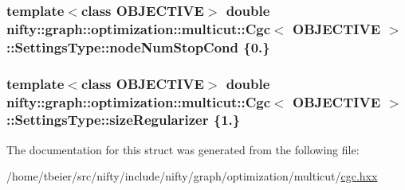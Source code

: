 \subsubsection[{node\+Num\+Stop\+Cond}]{\setlength{\rightskip}{0pt plus 5cm}template$<$class O\+B\+J\+E\+C\+T\+I\+V\+E$>$ double {\bf nifty\+::graph\+::optimization\+::multicut\+::\+Cgc}$<$ O\+B\+J\+E\+C\+T\+I\+V\+E $>$\+::Settings\+Type\+::node\+Num\+Stop\+Cond \{0.\}}\label{structnifty_1_1graph_1_1optimization_1_1multicut_1_1Cgc_1_1SettingsType_ae9427f6ec23229cc5e697504f73a7e4f}
\hypertarget{structnifty_1_1graph_1_1optimization_1_1multicut_1_1Cgc_1_1SettingsType_af336bc11dc1cd15a48db638d53dbc820}{}
\subsubsection[{size\+Regularizer}]{\setlength{\rightskip}{0pt plus 5cm}template$<$class O\+B\+J\+E\+C\+T\+I\+V\+E$>$ double {\bf nifty\+::graph\+::optimization\+::multicut\+::\+Cgc}$<$ O\+B\+J\+E\+C\+T\+I\+V\+E $>$\+::Settings\+Type\+::size\+Regularizer \{1.\}}\label{structnifty_1_1graph_1_1optimization_1_1multicut_1_1Cgc_1_1SettingsType_af336bc11dc1cd15a48db638d53dbc820}


The documentation for this struct was generated from the following file\+:\begin{DoxyCompactItemize}
\item 
/home/tbeier/src/nifty/include/nifty/graph/optimization/multicut/\hyperlink{cgc_8hxx}{cgc.\+hxx}\end{DoxyCompactItemize}
